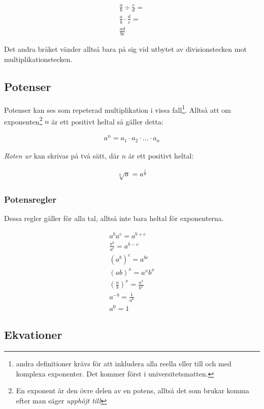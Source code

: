 \begin{align}
	\frac{a}{b} \div\frac{c}{d} = \\ 
	\frac{a}{b} \cdot \frac{d}{c} = \\
	\frac{ad}{bc}
\end{align}

Det andra bråket vänder alltså bara på sig vid utbytet av divisionstecken mot multiplikationstecken.

\newpage
\subsection{Potenser}
\label{Potenser}

Potenser kan ses som repeterad multiplikation i vissa fall\footnote{andra definitioner krävs för att inkludera alla reella eller till och med komplexa exponenter. Det kommer först i universitetsmatten.}. Alltså att om exponenten\footnote{En exponent är den övre delen av en potens, alltså det som brukar komma efter man säger \textit{upphöjt till}} $n$ är ett positivt heltal så gäller detta:

\begin{align}
	a^n = a_1 \cdot a_2 \cdot ... \cdot a_n
\end{align}

\textit{Roten ur} kan skrivas på två sätt, där $n$ är ett positivt heltal:

\begin{align}
	\sqrt[n]{a} = a^{\frac{1}{n}}
\end{align}

\newpage
\subsubsection{Potensregler}


Dessa regler gäller för alla tal, alltså inte bara heltal för exponenterna.

\begin{align}
	a^ba^c = a^{b+c} \\
	\frac{a^b}{a^c} = a^{b-c} \\
	(a^b)^c=a^{bc} \\
	(ab)^x=a^xb^x \\
	\left(\frac{a}{b}\right)^x=\frac{a^x}{b^x} \\
	a^{-b} = \frac{1}{a^b} \\
	a^0 = 1
\end{align}

\newpage
\subsection{Ekvationer}

